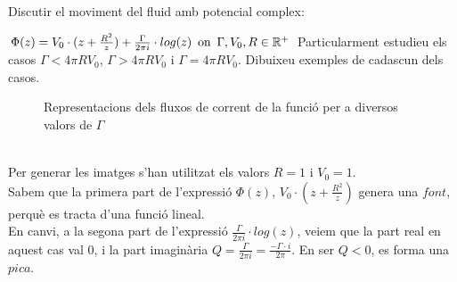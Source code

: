 \documentclass[a4paper, 11pt]{article}
\begin{document}
     Discutir el moviment del fluid amb potencial complex:
    \par
    $\Phi(z) = V_0 \cdot (z+\frac{R^2}{z}) + \frac{\Gamma}{2\pi i} \cdot log(z)
    \hspace{0.5em} \text{on} \hspace{0.5em} \Gamma, V_0, R \in \mathbb{R}^+$
\newline
Particularment estudieu els casos $\Gamma < 4\pi RV_0$, $\Gamma > 4\pi RV_0$ i $\Gamma = 4\pi RV_0$. Dibuixeu exemples de cadascun dels casos.
 \begin{figure}[h]
 \centering
 \label{18}
 \caption{Representacions dels fluxos de corrent de la funció per a diversos valors de $\Gamma$}
\end{figure}
\\Per generar les imatges s'han utilitzat els valors $R=1$ i $V_0=1$.\\
Sabem que la primera part de l'expressió $\Phi(z)$, $V_0 \cdot (z+\frac{R^2}{z})$ genera una $font$, perquè es tracta d'una funció lineal. \\
En canvi, a la segona part de l'expressió $\frac{\Gamma}{2\pi i} \cdot log(z)$, veiem que la part real en aquest cas val $0$, i la part imaginària $Q = \frac{\Gamma}{2\pi i} = \frac{-\Gamma \cdot i}{2\pi}$. En ser $Q < 0$, es forma una $pica$.\\
\end{document}
